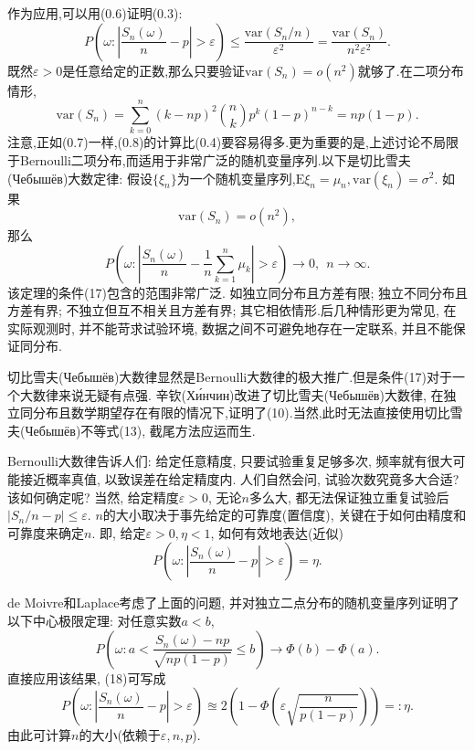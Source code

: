 作为应用,可以用(0.6)证明(0.3):
\begin{equation}
P\left(\omega:\left|\frac{S_n(\omega)}{n}-p\right|>\varepsilon \right)
\leqslant \frac{\mathrm{var}(S_n/n)}{\varepsilon^2} = \frac{\mathrm{var}(S_n)}{n^2\varepsilon^2}.
\end{equation}
既然$\varepsilon>0$是任意给定的正数,那么只要验证$\mathrm{var}(S_n) = o(n^2)$就够了.在二项分布情形,
\begin{equation}
\mathrm{var}(S_n) = \sum_{k=0}^n(k-np)^2\binom{n}{k}p^k(1-p)^{n-k} = np(1-p).
\end{equation}
注意,正如(0.7)一样,(0.8)的计算比(0.4)要容易得多.更为重要的是,上述讨论不局限于Bernoulli二项分布,而适用于非常广泛的随机变量序列.以下是切比雪夫(Чебышёв)大数定律:
假设$\{\xi_n\}$为一个随机变量序列,$\mathrm{E}\xi_n = \mu_n, \mathrm{var}(\xi_n) = \sigma^2$. 如果\begin{equation}
\mathrm{var}(S_n) = o(n^2),
\end{equation}
那么\begin{equation}
P\left(\omega:\left|\frac{S_n(\omega)}{n}-\frac{1}{n}\sum_{k=1}^n\mu_k\right|>\varepsilon \right)\to 0,~~n\to\infty.
\end{equation}
该定理的条件(17)包含的范围非常广泛. 如独立同分布且方差有限; 独立不同分布且方差有界; 不独立但互不相关且方差有界; 其它相依情形.后几种情形更为常见, 在实际观测时, 并不能苛求试验环境, 数据之间不可避免地存在一定联系, 并且不能保证同分布.

切比雪夫(Чебышёв)大数律显然是Bernoulli大数律的极大推广.但是条件(17)对于一个大数律来说无疑有点强. 辛钦(Хи́нчин)改进了切比雪夫(Чебышёв)大数律, 在独立同分布且数学期望存在有限的情况下,证明了(10).当然,此时无法直接使用切比雪夫(Чебышёв)不等式(13), 截尾方法应运而生.

Bernoulli大数律告诉人们: 给定任意精度, 只要试验重复足够多次, 频率就有很大可能接近概率真值, 以致误差在给定精度内. 人们自然会问, 试验次数究竟多大合适? 该如何确定呢? 当然, 给定精度$\varepsilon>0$, 无论$n$多么大, 都无法保证独立重复试验后$|S_n/n-p|\leqslant\varepsilon$. $n$的大小取决于事先给定的可靠度(置信度), 关键在于如何由精度和可靠度来确定$n$. 即, 给定$\varepsilon>0,\eta<1$, 如何有效地表达(近似)\begin{equation}
P\left( \omega:\left| \frac{S_n(\omega)}{n}-p \right|>\varepsilon \right) = \eta.
\end{equation}

de Moivre和Laplace考虑了上面的问题, 并对独立二点分布的随机变量序列证明了以下中心极限定理: 对任意实数$a<b$,\begin{equation}
P\left( \omega:a<\frac{S_n(\omega)-np}{\sqrt{np(1-p)}} \leqslant b  \right) \to \Phi(b)-\Phi(a).
\end{equation}
直接应用该结果, (18)可写成\begin{equation}
P\left( \omega:\left| \frac{S_n(\omega)}{n}-p \right|>\varepsilon \right) \approxeq 2\left( 1-\Phi\left(\varepsilon\sqrt{\frac{n}{p(1-p)}}\right) \right)=: \eta.
\end{equation}
由此可计算$n$的大小(依赖于$\varepsilon,n,p$).

